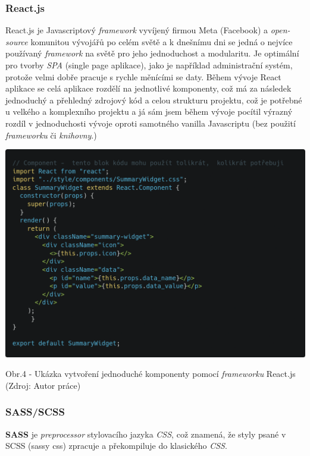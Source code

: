 \documentclass[12pt,a4paper]{report}
\begin{document}
  \subsubsection{React.js}
  React.js je Javascriptový \emph{framework} vyvíjený firmou Meta (Facebook) a \emph{open-source} komunitou
  vývojářů po celém světě a k dnešnímu dni se jedná o nejvíce používaný \emph{framework} na světě pro
  jeho jednoduchost a modularitu.
  Je optimální pro tvorby \emph{SPA} (single page aplikace), jako je například administrační systém, protože
  velmi dobře pracuje s rychle měnícími se daty. Během vývoje React aplikace se celá aplikace
  rozdělí na jednotlivé komponenty, což má za následek jednoduchý a přehledný zdrojový kód a
  celou strukturu projektu, což je potřebné u velkého a komplexního projektu a já sám jsem během
  vývoje pocítil výrazný rozdíl v jednoduchosti vývoje oproti samotného vanilla Javascriptu (bez
  použití \emph{frameworku} či \emph{knihovny}.)

  \vspace*{0.5cm}
  \noindent\includegraphics[width=\linewidth]{reactCodeblock.png}
  \begin{center}
    Obr.4 - Ukázka vytvoření jednoduché komponenty pomocí \emph{frameworku} React.js \\
    (Zdroj: Autor práce)
  \end{center}

  \subsubsection{SASS/SCSS}
  \textbf{SASS} je \emph{preprocessor} stylovacího jazyka \emph{CSS}, což znamená, že styly psané v SCSS (sassy css)
  zpracuje a překompiluje do klasického \emph{CSS}.
  
\end{document}
